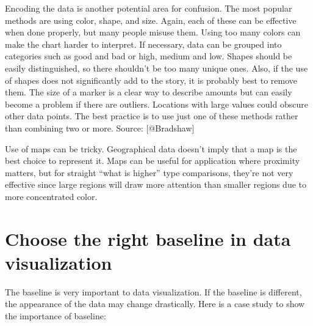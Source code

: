 \documentclass[]{book}
\theoremstyle{definition}
\theoremstyle{definition}
\theoremstyle{definition}
\theoremstyle{remark}
\begin{document}
Encoding the data is another potential area for confusion. The most
popular methods are using color, shape, and size. Again, each of these
can be effective when done properly, but many people misuse them. Using
too many colors can make the chart harder to interpret. If necessary,
data can be grouped into categories such as good and bad or high, medium
and low. Shapes should be easily distinguished, so there shouldn't be
too many unique ones. Also, if the use of shapes does not significantly
add to the story, it is probably best to remove them. The size of a
marker is a clear way to describe amounts but can easily become a
problem if there are outliers. Locations with large values could obscure
other data points. The best practice is to use just one of these methods
rather than combining two or more. Source: {[}@Bradshaw{]}

Use of maps can be tricky. Geographical data doesn't imply that a map is
the best choice to represent it. Maps can be useful for application
where proximity matters, but for straight ``what is higher'' type
comparisons, they're not very effective since large regions will draw
more attention than smaller regions due to more concentrated color.

\section{Choose the right baseline in data
visualization}\label{choose-the-right-baseline-in-data-visualization}

The baseline is very important to data visualization. If the baseline is
different, the appearance of the data may change drastically. Here is a
case study to show the importance of baseline:
\end{document}
